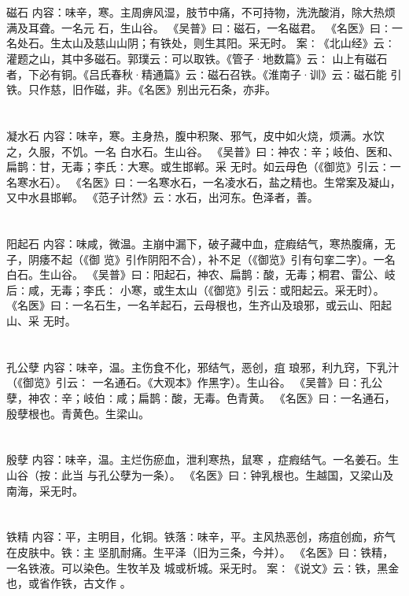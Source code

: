 \documentclass[12pt,UTF8]{ctexbook}
\begin{document}
\chapter{}磁石
内容：味辛，寒。主周痹风湿，肢节中痛，不可持物，洗洗酸消，除大热烦满及耳聋。一名元 
石，生山谷。 
《吴普》曰∶磁石，一名磁君。 
《名医》曰∶一名处石。生太山及慈山山阴；有铁处，则生其阳。采无时。 
案∶《北山经》云∶灌题之山，其中多磁石。郭璞云∶可以取铁。《管子·地数篇》云∶ 
山上有磁石者，下必有铜。《吕氏春秋·精通篇》云∶磁石召铁。《淮南子·训》云∶磁石能 
引铁。只作慈，旧作磁，非。《名医》别出元石条，亦非。 


\chapter{}凝水石
内容：味辛，寒。主身热，腹中积聚、邪气，皮中如火烧，烦满。水饮之，久服，不饥。一名 
白水石。生山谷。 
《吴普》曰∶神农∶辛；岐伯、医和、扁鹊∶甘，无毒；李氏∶大寒。或生邯郸。采 
无时。如云母色（《御览》引云∶一名寒水石）。 
《名医》曰∶一名寒水石，一名凌水石，盐之精也。生常案及凝山，又中水县邯郸。 
《范子计然》云∶水石，出河东。色泽者，善。 


\chapter{}阳起石
内容：味咸，微温。主崩中漏下，破子藏中血，症瘕结气，寒热腹痛，无子，阴痿不起（《御 
览》引作阴阳不合），补不足（《御览》引有句挛二字）。一名白石。生山谷。 
《吴普》曰∶阳起石，神农、扁鹊∶酸，无毒；桐君、雷公、岐后∶咸，无毒；李氏∶ 
小寒，或生太山（《御览》引云∶或阳起云。采无时）。 
《名医》曰∶一名石生，一名羊起石，云母根也，生齐山及琅邪，或云山、阳起山、采 
无时。 


\chapter{}孔公孽
内容：味辛，温。主伤食不化，邪结气，恶创，疽 琅邪，利九窍，下乳汁（《御览》引云∶ 
一名通石。《大观本》作黑字）。生山谷。 
《吴普》曰∶孔公孽，神农∶辛；岐伯∶咸；扁鹊∶酸，无毒。色青黄。 
《名医》曰∶一名通石，殷孽根也。青黄色。生梁山。 


\chapter{}殷孽
内容：味辛，温。主烂伤瘀血，泄利寒热，鼠寒 ，症瘕结气。一名姜石。生山谷（按∶此当 
与孔公孽为一条）。 
《名医》曰∶钟乳根也。生越国，又梁山及南海，采无时。 


\chapter{}铁精
内容：平，主明目，化铜。铁落∶味辛，平。主风热恶创，疡疽创痂，疥气在皮肤中。铁∶主 
坚肌耐痛。生平泽（旧为三条，今并）。 
《名医》曰∶铁精，一名铁液。可以染色。生牧羊及 城或析城。采无时。 
案∶《说文》云∶铁，黑金也，或省作铁，古文作 。 
\end{document}
